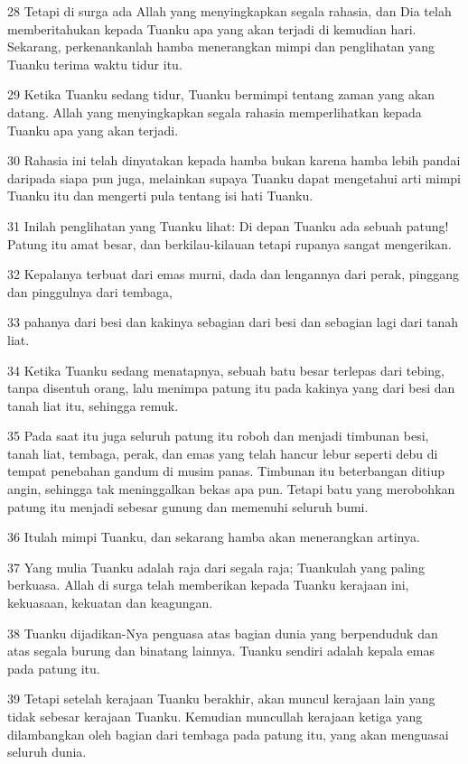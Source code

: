 \par 28 Tetapi di surga ada Allah yang menyingkapkan segala rahasia, dan Dia telah memberitahukan kepada Tuanku apa yang akan terjadi di kemudian hari. Sekarang, perkenankanlah hamba menerangkan mimpi dan penglihatan yang Tuanku terima waktu tidur itu.
\par 29 Ketika Tuanku sedang tidur, Tuanku bermimpi tentang zaman yang akan datang. Allah yang menyingkapkan segala rahasia memperlihatkan kepada Tuanku apa yang akan terjadi.
\par 30 Rahasia ini telah dinyatakan kepada hamba bukan karena hamba lebih pandai daripada siapa pun juga, melainkan supaya Tuanku dapat mengetahui arti mimpi Tuanku itu dan mengerti pula tentang isi hati Tuanku.
\par 31 Inilah penglihatan yang Tuanku lihat: Di depan Tuanku ada sebuah patung! Patung itu amat besar, dan berkilau-kilauan tetapi rupanya sangat mengerikan.
\par 32 Kepalanya terbuat dari emas murni, dada dan lengannya dari perak, pinggang dan pinggulnya dari tembaga,
\par 33 pahanya dari besi dan kakinya sebagian dari besi dan sebagian lagi dari tanah liat.
\par 34 Ketika Tuanku sedang menatapnya, sebuah batu besar terlepas dari tebing, tanpa disentuh orang, lalu menimpa patung itu pada kakinya yang dari besi dan tanah liat itu, sehingga remuk.
\par 35 Pada saat itu juga seluruh patung itu roboh dan menjadi timbunan besi, tanah liat, tembaga, perak, dan emas yang telah hancur lebur seperti debu di tempat penebahan gandum di musim panas. Timbunan itu beterbangan ditiup angin, sehingga tak meninggalkan bekas apa pun. Tetapi batu yang merobohkan patung itu menjadi sebesar gunung dan memenuhi seluruh bumi.
\par 36 Itulah mimpi Tuanku, dan sekarang hamba akan menerangkan artinya.
\par 37 Yang mulia Tuanku adalah raja dari segala raja; Tuankulah yang paling berkuasa. Allah di surga telah memberikan kepada Tuanku kerajaan ini, kekuasaan, kekuatan dan keagungan.
\par 38 Tuanku dijadikan-Nya penguasa atas bagian dunia yang berpenduduk dan atas segala burung dan binatang lainnya. Tuanku sendiri adalah kepala emas pada patung itu.
\par 39 Tetapi setelah kerajaan Tuanku berakhir, akan muncul kerajaan lain yang tidak sebesar kerajaan Tuanku. Kemudian muncullah kerajaan ketiga yang dilambangkan oleh bagian dari tembaga pada patung itu, yang akan menguasai seluruh dunia.
